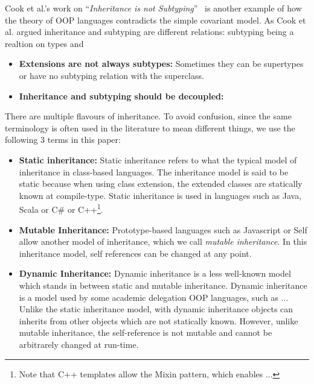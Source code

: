 Cook et al.'s work on ``\emph{Inheritance is not Subtyping}''~\cite{}
is another example of how the theory of  OOP languages contradicts 
the simple covariant model. As Cook et al. argued inheritance and
subtyping are different relations: subtyping being a realtion on types 
and 

\begin{itemize}

\item {\bf Extensions are not always subtypes:} Sometimes they can 
be supertypes or have no subtyping relation with the superclass. 

\item {\bf Inheritance and subtyping should be decoupled:}

\end{itemize}

There are multiple flavours of inheritance. To avoid confusion, since 
the same terminology is often used in the literature to mean different 
things, we use the following 3 terms in this paper:

\begin{itemize}

\item{{\bf Static inheritance:}} Static inheritance refers to what the
  typical model of inheritance in class-based languages. The
  inheritance model is said to be static because when using class
  extension, the extended classes are statically known at compile-type.
Static inheritance is used in languages such as Java, Scala or C\# or
C++\footnote{Note that C++ templates allow the Mixin pattern, which
  enables ...}.

\item{{\bf Mutable Inheritance:}} Prototype-based languages such as 
Javascript or Self allow another model of inheritance, which we call
\emph{mutable inheritance}. In this inheritance model, self references 
can be changed at any point. 

\item{{\bf Dynamic Inheritance:}} Dynamic inheritance is a less well-known 
model which stands in between static and mutable inheritance.
Dynamic inheritance is a model used by some academic delegation 
OOP languages, such as ...  
Unlike the static inheritance model, with dynamic inheritance 
objects can inherits from other objects which are not statically
known. However, unlike mutable inheritance, the self-reference is not 
mutable and cannot be arbitrarely changed at run-time. 

\end{itemize}

